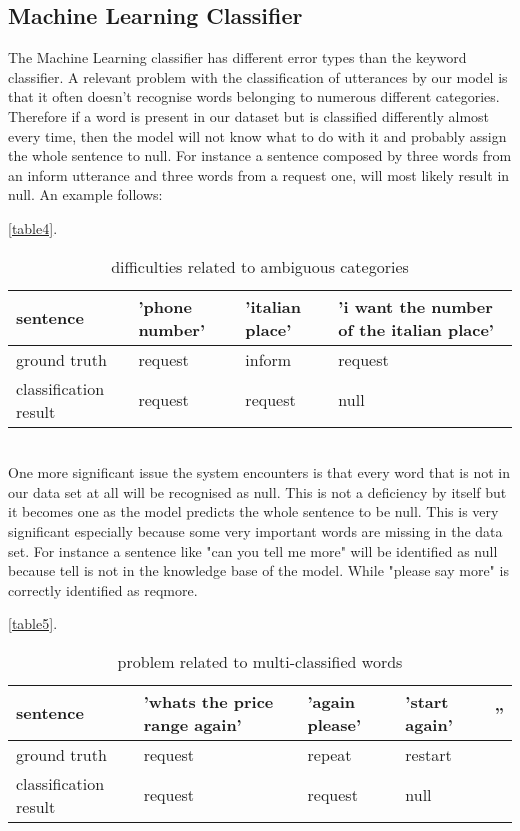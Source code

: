 \documentclass[a4paper]{article}
\begin{document}
\subsection{Machine Learning Classifier}
\label{ml}
The Machine Learning classifier has different error types than the keyword classifier.
A relevant problem with the classification of utterances by our model is that it often doesn't recognise words belonging to numerous different categories. 
Therefore if a word is present in our dataset but is classified differently almost every time, then the model will not know what to do with it and probably assign the whole sentence to null. 
For instance a sentence composed by three words from an inform utterance and three words from a request one, will most likely result in null. 
An example follows: 

\autoref{table4}. 
\begin{table}[h!]
    \centering
    \begin{tabular}{l|l|l|l}
     sentence & 'phone number' & 'italian place' & 'i want the number of the italian place' \\ \hline
     ground truth & request & inform & request \\ \hline
     classification result & request & request & null
    \end{tabular}
    \caption{difficulties related to ambiguous categories}
    \label{table4}
\end{table}{} \\

One more significant issue the system encounters is that every word that is not in our data set at all will be recognised as null.
This is not a deficiency by itself but it becomes one as the model predicts the whole sentence to be null. 
This is very significant especially because some very important words are missing in the data set. 
For instance a sentence like "can you tell me more" will be identified as null because tell is not in the knowledge base of the model. While "please say more" is correctly identified as reqmore.

\autoref{table5}. 
\begin{table}[h!]
    \centering
    \begin{tabular}{l|l|l|l|l}
     sentence & 'whats the price range again' & 'again please' & 'start again' & '' \\ \hline
     ground truth & request & repeat & restart \\ \hline
     classification result & request & request & null
    \end{tabular}
    \caption{problem related to multi-classified words}
    \label{table5}
\end{table}{} \\
\end{document}
